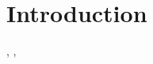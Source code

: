 \chapter{Introduction}
\citep{Kuijken_2008}, \cite{Refregier_2003_1}, \cite{Refregier_2003_2} \cite{Kuijken_2015}











